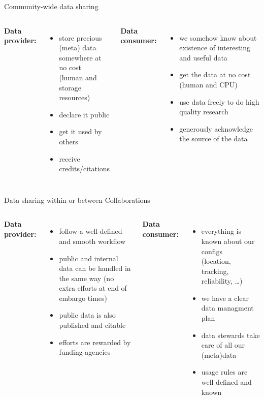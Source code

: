 \documentclass[aspectratio=169,xcolor=dvipsnames]{beamer}
\begin{document}
\begin{frame}{Community-wide data sharing}

  \begin{columns}[c]
    {\bf Data provider:}
    \begin{itemize}
    \item store precious (meta) data \\
      somewhere at \alert{no cost} \\
      (human and storage resources)
    \item declare it \alert{public}
    \item get it used by others
    \item receive credits/citations
    \end{itemize}

    {\bf Data consumer:}
    \begin{itemize}
    \item we \alert{somehow} know about existence of interesting and useful data
    \item get the data at \alert{no cost} (human and CPU)
    \item use data freely to do high quality research
    \item generously acknowledge the source of the data
    \end{itemize}

  \end{columns}

\end{frame}

\begin{frame}{Data sharing within or between Collaborations}

  \begin{columns}[c]
    {\bf Data provider:}
    \begin{itemize}
    \item follow a well-defined and smooth workflow
    \item public and internal data can be handled in \\
      the same way 
      (no extra efforts at end of embargo times)
    \item public data is also published and citable
    \item efforts are rewarded by funding agencies
    \end{itemize}
    {\bf Data consumer:}    
    \begin{itemize}
    \item everything is known about our configs\\
      (location, tracking, reliability, \ldots)
    \item we have a clear data managment plan
    \item data stewards take care of all our (meta)data
    \item usage rules are well defined and known
    \end{itemize}
    
  \end{columns}
\end{frame}
\end{document}
